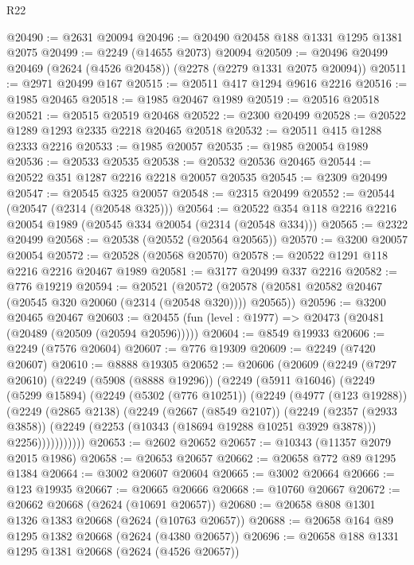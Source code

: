 \begin{lexlean}{R22}
\begin{coremodule}
@20490 := @2631 @20094
@20496 := @20490 @20458 @188 @1331 @1295 @1381 @2075
@20499 := @2249 (@14655 @2073) @20094
@20509 := @20496 @20499 @20469 (@2624 (@4526 @20458)) (@2278 (@2279 @1331 @2075 @20094))
@20511 := @2971 @20499 @167
@20515 := @20511 @417 @1294 @9616 @2216
@20516 := @1985 @20465
@20518 := @1985 @20467 @1989
@20519 := @20516 @20518
@20521 := @20515 @20519 @20468
@20522 := @2300 @20499
@20528 := @20522 @1289 @1293 @2335 @2218 @20465 @20518
@20532 := @20511 @415 @1288 @2333 @2216
@20533 := @1985 @20057
@20535 := @1985 @20054 @1989
@20536 := @20533 @20535
@20538 := @20532 @20536 @20465
@20544 := @20522 @351 @1287 @2216 @2218 @20057 @20535
@20545 := @2309 @20499
@20547 := @20545 @325 @20057
@20548 := @2315 @20499
@20552 := @20544 (@20547 (@2314 (@20548 @325)))
@20564 := @20522 @354 @118 @2216 @2216 @20054 @1989 (@20545 @334 @20054 (@2314 (@20548 @334)))
@20565 := @2322 @20499
@20568 := @20538 (@20552 (@20564 @20565))
@20570 := @3200 @20057 @20054
@20572 := @20528 (@20568 @20570)
@20578 := @20522 @1291 @118 @2216 @2216 @20467 @1989
@20581 := @3177 @20499 @337 @2216
@20582 := @776 @19219
@20594 := @20521
    (@20572 (@20578 (@20581 @20582 @20467 (@20545 @320 @20060 (@2314 (@20548 @320)))) @20565))
@20596 := @3200 @20465 @20467
@20603 := @20455 (fun (level : @1977) => @20473 (@20481 (@20489 (@20509 (@20594 @20596)))))
@20604 := @8549 @19933
@20606 := @2249 (@7576 @20604)
@20607 := @776 @19309
@20609 := @2249 (@7420 @20607)
@20610 := @8888 @19305
@20652 := @20606
    (@20609
      (@2249
        (@7297 @20610)
        (@2249
          (@5908 (@8888 @19296))
          (@2249
            (@5911 @16046)
            (@2249
              (@5299 @15894)
              (@2249
                (@5302 (@776 @10251))
                (@2249
                  (@4977 (@123 @19288))
                  (@2249
                    (@2865 @2138)
                    (@2249
                      (@2667 (@8549 @2107))
                      (@2249
                        (@2357 (@2933 @3858))
                        (@2249 (@2253 (@10343 (@18694 @19288 @10251 @3929 @3878))) @2256)))))))))))
@20653 := @2602 @20652
@20657 := @10343 (@11357 @2079 @2015 @1986)
@20658 := @20653 @20657
@20662 := @20658 @772 @89 @1295 @1384
@20664 := @3002 @20607 @20604
@20665 := @3002 @20664
@20666 := @123 @19935
@20667 := @20665 @20666
@20668 := @10760 @20667
@20672 := @20662 @20668 (@2624 (@10691 @20657))
@20680 := @20658 @808 @1301 @1326 @1383 @20668 (@2624 (@10763 @20657))
@20688 := @20658 @164 @89 @1295 @1382 @20668 (@2624 (@4380 @20657))
@20696 := @20658 @188 @1331 @1295 @1381 @20668 (@2624 (@4526 @20657))

\end{coremodule}
\end{lexlean}
